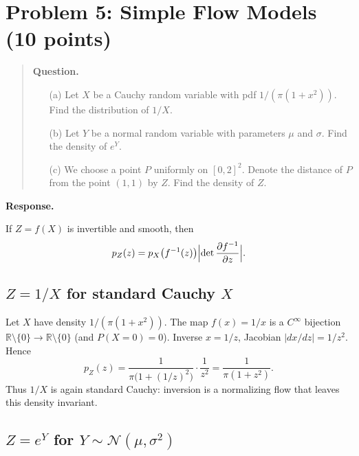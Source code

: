 \documentclass[11pt]{article}
\newenvironment{question}{%
  \par\addvspace{0.8em}%
  \begin{quote}\small
  \noindent\textbf{Question.}\enspace\ignorespaces
}{%
  \end{quote}%
  \par\nopagebreak
  \noindent\textbf{Response.}\par\nopagebreak\smallskip
}
\newcommand{\R}{\mathbb{R}}
\begin{document}
\section{Problem 5: Simple Flow Models (10 points)}

\begin{question}
\begin{enumerate}
  \item[(a)] Let \(X\) be a Cauchy random variable with pdf \(1/(\pi(1+x^2))\). Find the distribution of \(1/X\).
  \item[(b)] Let \(Y\) be a normal random variable with parameters \(\mu\) and \(\sigma\). Find the density of \(e^Y\).
  \item[(c)] We choose a point \(P\) uniformly on \([0,2]^2\). Denote the distance of \(P\) from the point \((1,1)\) by \(Z\). Find the density of \(Z\).
\end{enumerate}
\end{question}

If \(Z=f(X)\) is invertible and smooth, then
\begin{equation}
  p_Z(z)
  =p_X\bigl(f^{-1}(z)\bigr)
  \Bigl|\det\frac{\partial f^{-1}}{\partial z}\Bigr|.
\end{equation}

\subsection{\texorpdfstring{\(Z=1/X\) for standard Cauchy \(X\)}{Z = 1/X for standard Cauchy X}}

Let \(X\) have density \(1/(\pi(1+x^2))\). The map \(f(x)=1/x\) is a
\(C^\infty\) bijection \(\R\setminus\{0\}\to\R\setminus\{0\}\) (and
\(P(X=0)=0\)). Inverse \(x=1/z\), Jacobian \(|dx/dz|=1/z^2\). Hence
\begin{equation}
  p_Z(z)
  =\frac{1}{\pi\bigl(1+(1/z)^2\bigr)}\cdot\frac{1}{z^2}
  =\frac{1}{\pi(1+z^2)}.
\end{equation}
Thus \(1/X\) is again standard Cauchy: inversion is a normalizing flow
that leaves this density invariant.

\subsection{\texorpdfstring{\(Z=e^Y\) for \(Y\sim\mathcal{N}(\mu,\sigma^2)\)}{Z = e^Y for Y normal}}
\end{document}
